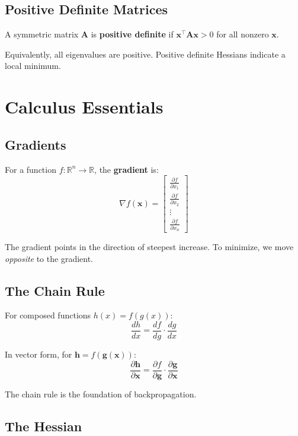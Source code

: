 \documentclass[../main.tex]{subfiles}
\begin{document}
\subsection*{Positive Definite Matrices}

A symmetric matrix $\mathbf{A}$ is \textbf{positive definite} if $\mathbf{x}^\top \mathbf{A} \mathbf{x} > 0$ for all nonzero $\mathbf{x}$.

Equivalently, all eigenvalues are positive. Positive definite Hessians indicate a local minimum.

\section*{Calculus Essentials}

\subsection*{Gradients}

For a function $f: \mathbb{R}^n \to \mathbb{R}$, the \textbf{gradient} is:
\[
\nabla f(\mathbf{x}) = \begin{bmatrix} \frac{\partial f}{\partial x_1} \\ \frac{\partial f}{\partial x_2} \\ \vdots \\ \frac{\partial f}{\partial x_n} \end{bmatrix}
\]

The gradient points in the direction of steepest increase. To minimize, we move \textit{opposite} to the gradient.

\subsection*{The Chain Rule}

For composed functions $h(x) = f(g(x))$:
\[
\frac{dh}{dx} = \frac{df}{dg} \cdot \frac{dg}{dx}
\]

In vector form, for $\mathbf{h} = f(\mathbf{g}(\mathbf{x}))$:
\[
\frac{\partial \mathbf{h}}{\partial \mathbf{x}} = \frac{\partial f}{\partial \mathbf{g}} \cdot \frac{\partial \mathbf{g}}{\partial \mathbf{x}}
\]

The chain rule is the foundation of backpropagation.

\subsection*{The Hessian}
\end{document}
